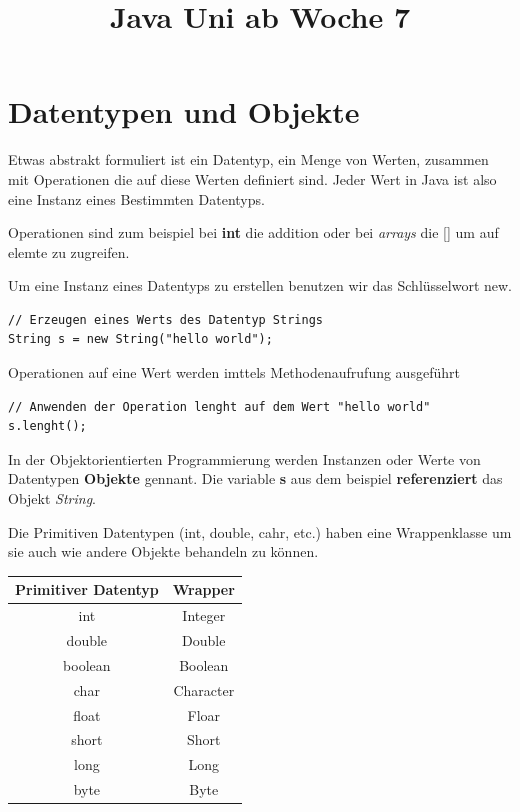 \documentclass[12pt]{article}
\title{Java Uni ab Woche 7}
\begin{document}
\maketitle
\tableofcontents

\section*{Datentypen und Objekte}
Etwas abstrakt formuliert ist ein Datentyp, ein Menge von Werten, zusammen mit Operationen die auf diese Werten definiert
sind. Jeder Wert in Java ist also eine Instanz eines Bestimmten Datentyps.

Operationen sind zum beispiel bei \textbf{int} die addition oder bei \textit{arrays} die [] um auf elemte zu zugreifen. 

Um eine Instanz eines Datentyps zu erstellen benutzen wir das Schlüsselwort new. 


    \begin{lstlisting}[label=some-code,caption=Erzeugung Instanz]
// Erzeugen eines Werts des Datentyp Strings
String s = new String("hello world");
    \end{lstlisting}


    Operationen auf eine Wert werden imttels Methodenaufrufung ausgeführt

    \begin{lstlisting}[label=some-code,caption=Erzeugung Instanz]
// Anwenden der Operation lenght auf dem Wert "hello world"
s.lenght();
    \end{lstlisting}

    In der Objektorientierten Programmierung werden Instanzen oder Werte von Datentypen \textbf{Objekte} gennant. 
    Die variable \textbf{s} aus dem beispiel \textbf{referenziert} das Objekt \textit{String}. 

    Die Primitiven Datentypen (int, double, cahr, etc.) haben eine Wrappenklasse um sie auch wie andere Objekte behandeln zu können. 

    \begin{table}[h]
        \centering
        \begin{tabular}{| c | c | }
            \hline
            Primitiver Datentyp & Wrapper \\
            \hline
            int & Integer \\
            \hline
            double & Double \\
            \hline 
            boolean & Boolean \\
            \hline 
            char & Character \\
            \hline 
            float & Floar \\
            \hline 
            short & Short \\
            \hline 
            long & Long \\
            \hline 
            byte & Byte \\
            \hline 
            

        \end{tabular}
    \end{table}
\end{document}
